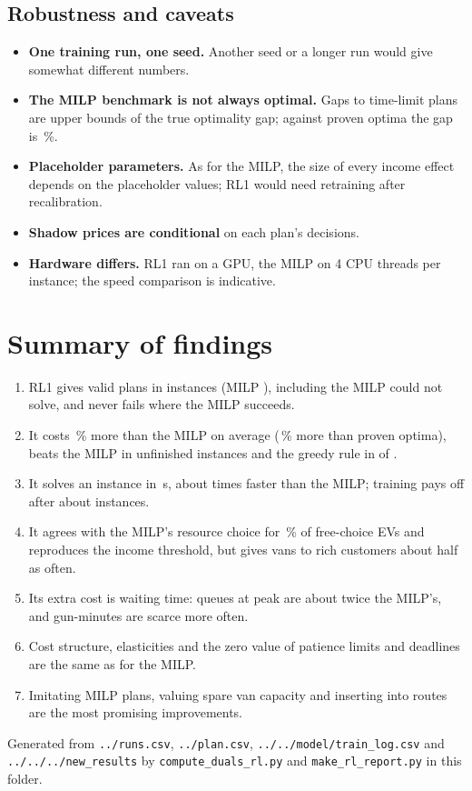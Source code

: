 \documentclass[11pt,a4paper]{article}
\newcommand{\pct}{\,\%}
\begin{document}
\subsection{Robustness and caveats}
\label{sec:robust}
\begin{itemize}
  \item \textbf{One training run, one seed.} Another seed or a longer run would give somewhat different numbers.
  \item \textbf{The MILP benchmark is not always optimal.} Gaps to time-limit plans are upper bounds of the true optimality gap; against proven optima the gap is \GapOptMean\pct.
  \item \textbf{Placeholder parameters.} As for the MILP, the size of every income effect depends on the placeholder values; RL1 would need retraining after recalibration.
  \item \textbf{Shadow prices are conditional} on each plan's decisions.
  \item \textbf{Hardware differs.} RL1 ran on a GPU, the MILP on 4 CPU threads per instance; the speed comparison is indicative.
\end{itemize}

\section{Summary of findings}
\begin{enumerate}
  \item RL1 gives valid plans in \NValidR{} instances (MILP \NValidM), including \RLonly{} the MILP could not solve, and never fails where the MILP succeeds.
  \item It costs \GapMean\pct{} more than the MILP on average (\GapOptMean\pct{} more than proven optima), beats the MILP in \RLbetter{} unfinished instances and the greedy rule in \GreedyBeat{} of \GreedyN.
  \item It solves an instance in \RLtime\,s, about \Speedup{} times faster than the MILP; training pays off after about \BreakEven{} instances.
  \item It agrees with the MILP's resource choice for \AgreeType\pct{} of free-choice EVs and reproduces the income threshold, but gives vans to rich customers about half as often.
  \item Its extra cost is waiting time: queues at peak are about twice the MILP's, and gun-minutes are scarce more often.
  \item Cost structure, elasticities and the zero value of patience limits and deadlines are the same as for the MILP.
  \item Imitating MILP plans, valuing spare van capacity and inserting into routes are the most promising improvements.
\end{enumerate}

\vspace{6pt}
{\footnotesize Generated from \texttt{../runs.csv}, \texttt{../plan.csv}, \texttt{../../model/train\_log.csv} and \texttt{../../../new\_results} by \texttt{compute\_duals\_rl.py} and \texttt{make\_rl\_report.py} in this folder.}
\end{document}
